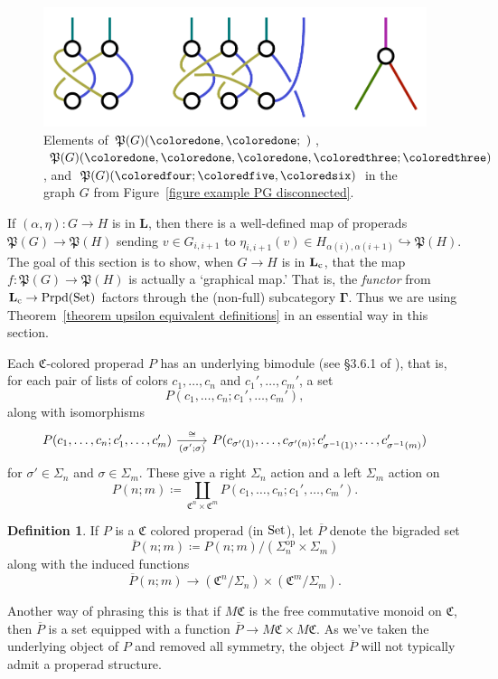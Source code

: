 \documentclass{amsart}
\numberwithin{theorem}{subsection}
\theoremstyle{definition}
\newtheorem{definition}[theorem]{Definition}
\providecommand{\op}{\mathrm{op}}
\newcommand{\name}[1]{\ensuremath{\text{\textup{#1}}}}
\newcommand{\levelg}{\mathbf{L}}
\newcommand{\levelgconn}{\levelg_{\name{c}}}
\newcommand{\hryGamma}{\mathbf{\Gamma}}
\newcommand{\Set}{\name{Set}}
\newcommand{\properads}{\name{Prpd}(\Set)}
\begin{document}
\begin{figure}[htb]
\includegraphics[scale=0.75]{disconnected_graph_elts.pdf}
\caption{Elements of $\mathfrak{P}(G)(\coloredone, \coloredone; \,\,)$, $\mathfrak{P}(G)(\coloredone, \coloredone, \coloredone, \coloredthree; \coloredthree)$, and $\mathfrak{P}(G)(\coloredfour; \coloredfive, \coloredsix)$ in the graph $G$ from Figure~\ref{figure example PG disconnected}.}
\label{figure example PG disconnected elements}
\end{figure}

If $(\alpha, \eta) : G \to H$ is in $\levelg$, then there is a well-defined map of properads $\mathfrak{P}(G) \to \mathfrak{P}(H)$ sending $v\in G_{i,i+1}$ to $\eta_{i,i+1}(v) \in H_{\alpha(i),\alpha(i+1)} \hookrightarrow \mathfrak{P}(H)$. 
The goal of this section is to show, when $G \to H$ is in $\levelgconn$, that the map $f : \mathfrak{P}(G) \to \mathfrak{P}(H)$ is actually a `graphical map.'
That is, the \emph{functor} from $\levelgconn \to \properads$ factors through the (non-full) subcategory $\hryGamma$.
Thus we are using Theorem~\ref{theorem upsilon equivalent definitions} in an essential way in this section.

Each $\mathfrak{C}$-colored properad $P$ has an underlying bimodule (see \S3.6.1 of \cite{hrybook}), that is, for each pair of lists of colors $c_1,\dots, c_n$ and $c_1', \dots, c_m'$, a set
\[
	P(c_1,\dots, c_n; c_1', \dots, c_m'),
\]
along with isomorphisms 
\[ \begin{tikzcd}
P(c_1,\dots, c_n ; c_1', \dots, c_m') \rar["\cong","(\sigma';\sigma)" swap] & P(c_{\sigma'(1)},\dots, c_{\sigma'(n)} ; c_{\sigma^{-1}(1)}', \dots, c_{\sigma^{-1}(m)}')
\end{tikzcd} \]
for $\sigma' \in \Sigma_n$ and $\sigma \in \Sigma_m$.
These give a right $\Sigma_n$ action and a left $\Sigma_m$ action on 
\[
	P(n;m) \coloneqq \coprod_{\mathfrak{C}^n \times \mathfrak{C}^m} P(c_1,\dots, c_n ; c_1', \dots, c_m').
\]
\begin{definition}
If $P$ is a $\mathfrak{C}$ colored properad (in $\Set$), let $\overline{P}$ denote the bigraded set
\[
	\overline{P}(n;m) \coloneqq P(n;m)/(\Sigma_n^{\op} \times \Sigma_m)
\]
along with the induced functions
\[
	\overline{P}(n;m) \to (\mathfrak{C}^n/\Sigma_n) \times (\mathfrak{C}^m / \Sigma_m).
\]
\end{definition}
Another way of phrasing this is that if $M\mathfrak{C}$ is the free commutative monoid on $\mathfrak{C}$, then $\overline{P}$ is a set equipped with a function $\overline{P} \to M\mathfrak{C} \times M\mathfrak{C}$.
As we've taken the underlying object of $P$ and removed all symmetry, the object $\overline{P}$ will not typically admit a properad structure.
\end{document}
